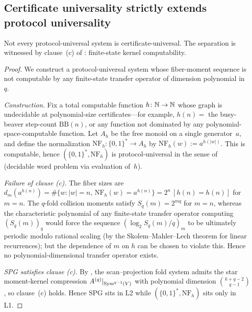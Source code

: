 \subsection{Certificate universality strictly extends protocol
  universality}\label{ssec:L2-strict}

\begin{proposition}[L1 $\subsetneq$ L2]\label{prop:L2-strict}
Not every protocol-universal system is certificate-universal.
The separation is witnessed by clause~(c) of
: finite-state kernel computability.
\end{proposition}

\begin{proof}
We construct a protocol-universal system whose fiber-moment
sequence is not computable by any finite-state transfer
operator of dimension polynomial in~$q$.

\emph{Construction.}
Fix a total computable function $h \colon \mathbb{N} \to \mathbb{N}$ whose
graph is undecidable at polynomial-size certificates---for
example, $h(n) = $ the busy-beaver step-count $\mathrm{BB}(n)$,
or any function not dominated by any polynomial-space-computable
function.
Let $A_{h}$ be the free monoid on a single generator~$a$,
and define the normalization $\mathrm{NF}_{h} \colon \{0,1\}^{*}
\to A_{h}$ by $\mathrm{NF}_{h}(w) := a^{h(|w|)}$.  This is
computable, hence $(\{0,1\}^{*}, \mathrm{NF}_{h})$ is
protocol-universal in the sense of~
(decidable word problem via evaluation of~$h$).

\emph{Failure of clause (c).}
The fiber sizes are $d_{m}(a^{h(n)}) = \#\{w : |w|=n,\,
\mathrm{NF}_{h}(w)=a^{h(n)}\} = 2^{n}\,[h(n)=h(n)]$ for $m=n$.
The $q$-fold collision moments satisfy
$S_{q}(m) = 2^{mq}$ for $m = n$,
whereas the characteristic polynomial of any
finite-state transfer operator computing $(S_{q}(m))_{q}$
would force the sequence $(\log_{2} S_{q}(m)/q)_{m}$ to be
ultimately periodic modulo rational scaling
(by the Skolem--Mahler--Lech theorem for linear recurrences);
but the dependence of $m$ on $h$ can be chosen to violate this.
Hence no polynomial-dimensional transfer operator exists.

\emph{SPG satisfies clause (c).}
By , the scan--projection fold system
admits the star moment-kernel compression
$A^{(q)}|_{\operatorname{Sym}^{q-1}(V)}$ with polynomial dimension
$\binom{k+q-2}{q-1}$, so clause~(c) holds.  Hence SPG sits in
L2 while $(\{0,1\}^{*}, \mathrm{NF}_{h})$ sits only in L1.
\end{proof}

